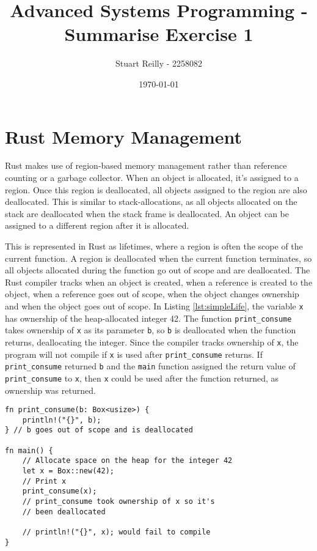 \documentclass[10pt,a4paper,twocolumn]{article}
\begin{document}
\title{Advanced Systems Programming - Summarise Exercise 1}
\author{Stuart Reilly - 2258082}
\date{\today}

\maketitle

\section{Rust Memory Management}
\label{rustMem}
Rust makes use of region-based memory management rather than reference counting or a garbage
collector.
When an object is allocated, it's assigned to a region.
Once this region is deallocated, all objects assigned to the region are also deallocated.
This is similar to stack-allocations, as all objects allocated on the stack are deallocated
when the stack frame is deallocated.
An object can be assigned to a different region after it is allocated.

This is represented in Rust as lifetimes, where a region is often the scope of the current
function.
A region is deallocated when the current function terminates, so all objects allocated during
the function go out of scope and are deallocated.
The Rust compiler tracks when an object is created, when a reference is created to the object,
when a reference goes out of scope, when the object changes ownership and when the object goes
out of scope.
In Listing \ref{lst:simpleLife}, the variable \lstinline{x} has ownership of the heap-allocated
integer 42.
The function \lstinline{print_consume} takes ownership of \lstinline{x} as its parameter
\lstinline{b}, so \lstinline{b} is deallocated when the function returns, deallocating the integer.
Since the compiler tracks ownership of \lstinline{x}, the program will not compile if \lstinline{x}
is used after \lstinline{print_consume} returns.
If \lstinline{print_consume} returned \lstinline{b} and the \lstinline{main} function assigned the
return value of \lstinline{print_consume} to \lstinline{x}, then \lstinline{x} could be used after
the function returned, as ownership was returned.

\begin{lstlisting}[float=h, label=lst:simpleLife, caption={A short example of
	when a object is allocated and deallocated in Rust.}]
fn print_consume(b: Box<usize>) {
	println!("{}", b);
} // b goes out of scope and is deallocated

fn main() {
	// Allocate space on the heap for the integer 42
	let x = Box::new(42); 
	// Print x
	print_consume(x);
	// print_consume took ownership of x so it's
	// been deallocated

	// println!("{}", x); would fail to compile
}
\end{lstlisting}
\end{document}
